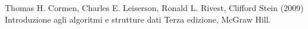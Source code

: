 \begin{thebibliography}{9}
Thomas H. Cormen, Charles E. Leiserson, Ronald L. Rivest, Clifford Stein (2009) Introduzione agli algoritmi e strutture dati Terza edizione, McGraw Hill.

\end{thebibliography}